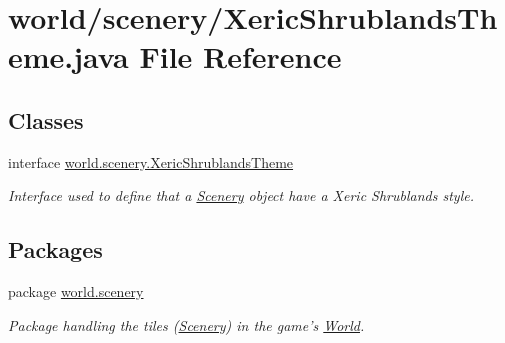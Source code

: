 \hypertarget{a00078}{\section{world/scenery/\-Xeric\-Shrublands\-Theme.java File Reference}
\label{a00078}
}
\subsection*{Classes}
\begin{DoxyCompactItemize}
\item 
interface \hyperlink{a00040}{world.\-scenery.\-Xeric\-Shrublands\-Theme}
\begin{DoxyCompactList}\small\item\em Interface used to define that a \hyperlink{a00024}{Scenery} object have a Xeric Shrublands style. \end{DoxyCompactList}\end{DoxyCompactItemize}
\subsection*{Packages}
\begin{DoxyCompactItemize}
\item 
package \hyperlink{a00091}{world.\-scenery}
\begin{DoxyCompactList}\small\item\em Package handling the tiles (\hyperlink{a00024}{Scenery}) in the game's \hyperlink{a00039}{World}. \end{DoxyCompactList}\end{DoxyCompactItemize}
